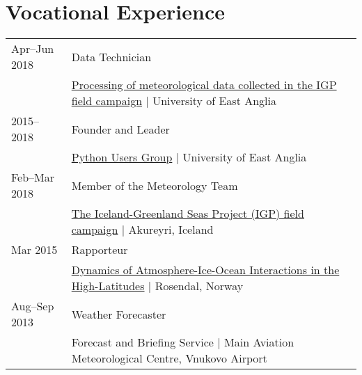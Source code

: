 \documentclass[a4paper, 11pt]{article}
\begin{document}
\section{Vocational Experience}
\begin{tabularx}{\linewidth}{@{}l X@{}}
Apr--Jun 2018 & Data Technician \\ & \href{https://github.com/IGPResearch}{Processing of meteorological data collected in the IGP field campaign} | University of East Anglia \\
2015--2018 & Founder and Leader \\ & \href{https://ueapy.github.io/}{Python Users Group} | University of East Anglia \\
Feb--Mar 2018 & Member of the Meteorology Team \\ & \href{https://twitter.com/igpresearch}{The Iceland-Greenland Seas Project (IGP) field campaign} | Akureyri, Iceland \\
Mar 2015 & Rapporteur \\ & \href{https://highlatdynamics.w.uib.no}{Dynamics of Atmosphere-Ice-Ocean Interactions in the High-Latitudes} | Rosendal, Norway \\
Aug--Sep 2013 & Weather Forecaster \\ & Forecast and Briefing Service | Main Aviation Meteorological Centre, Vnukovo Airport \\
\end{tabularx}

\end{document}
